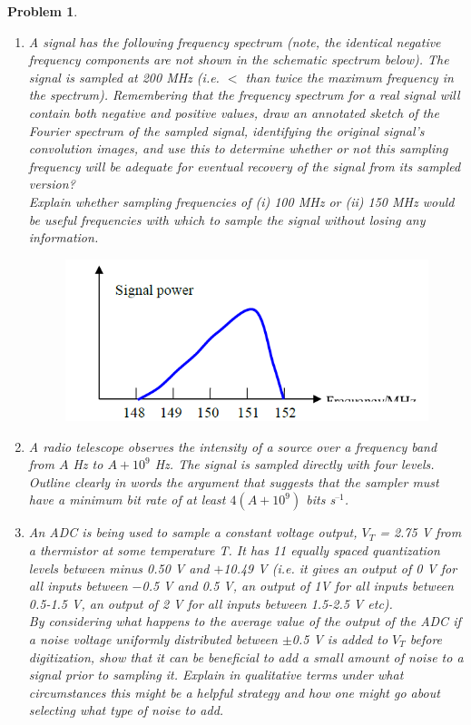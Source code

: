 \documentclass[a4paper]{article}
\theoremstyle{new}
\newtheorem{qns}{Problem}[section]
\begin{document}
\begin{qns}\leavevmode
\begin{enumerate}[label=(\alph*)]
\item A signal has the following frequency spectrum (note, the identical negative frequency components are not shown in the schematic spectrum below). The signal is sampled at 200 MHz (i.e. $<$ than twice the maximum frequency in the spectrum). Remembering that the frequency spectrum for a real signal will contain both negative and positive values, draw an annotated sketch of the Fourier spectrum of the sampled signal, identifying the original signal’s convolution images, and use this to determine whether or not this sampling frequency will be adequate for eventual recovery of the signal from its sampled version?\\[5pt]
Explain whether sampling frequencies of (i) 100 MHz or (ii) 150 MHz would be useful frequencies with which to sample the signal without losing any information.
\begin{figure}[H]
    \centering
    \includegraphics[scale=0.5]{1_9.PNG}
\end{figure}
\item  A radio telescope observes the intensity of a source over a frequency band from $A$ Hz to $A+10^9$ Hz. The signal is sampled directly with four levels. Outline clearly in words the argument that suggests that the sampler must have a minimum bit rate of at least $4(A+10^9)$ bits s$^{–1}$.
\item An ADC is being used to sample a constant voltage output, $V_T$ = 2.75 V from a thermistor at some temperature T. It has 11 equally spaced quantization levels between minus 0.50 V and $+$10.49 V (i.e. it gives an output of 0 V for all inputs between $-$0.5 V and 0.5 V, an output of 1V for all inputs between 0.5-1.5 V, an output of 2 V for all inputs between 1.5-2.5 V etc).\\[5pt]
By considering what happens to the average value of the output of the ADC if a noise voltage uniformly distributed between $\pm$0.5 V is added to $V_T$ before digitization, show that it can be beneficial to add a small amount of noise to a signal prior to sampling it. Explain in qualitative terms under what circumstances this might be a helpful strategy and how one might go about selecting what type of noise to add.
\end{enumerate}
\end{qns}
\end{document}
